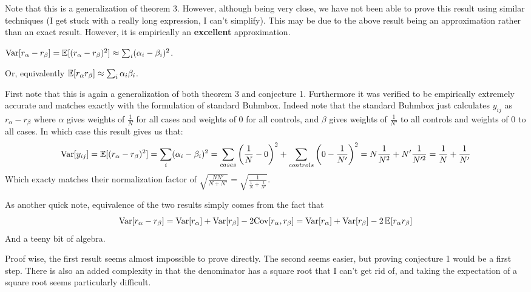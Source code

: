 \documentclass[11pt]{hw-template}
\begin{document}
  \begin{remark}
    Note that this is a generalization of theorem 3. However, although being very close, we have not been able to prove this result using similar techniques (I get stuck with a really long expression,
    I can't simplify). This may be due to the above result being an approximation rather than an exact result. However, it is empirically an \textbf{excellent} approximation.
  \end{remark}

  \begin{conjecture}
    $\operatorname{Var}[r_\alpha - r_\beta] = \operatorname{\mathbb{E}}[(r_\alpha - r_\beta)^2] \approx \sum_i (\alpha_i - \beta_i)^2$.
    
    Or, equivalently $\operatorname{\mathbb{E}}[r_\alpha r_\beta] \approx \sum_i \alpha_i \beta_i$.
  \end{conjecture}

  \begin{remark}
    First note that this is again a generalization of both theorem 3 and conjecture 1. Furthermore it was verified to be empirically extremely accurate and matches exactly with the formulation of standard Buhmbox.
    Indeed note that the standard Buhmbox just calculates $y_{ij}$ as $r_\alpha - r_\beta$ where $\alpha$ gives weights of $\frac{1}{N}$ for all cases and weights of 0 for all controls, and $\beta$ gives weights
    of $\frac{1}{N'}$ to all controls and weights of 0 to all cases. In which case this result gives us that:
    $$\operatorname{Var}[y_{ij}] = \operatorname{\mathbb{E}}[(r_\alpha - r_\beta)^2] = \sum_i (\alpha_i - \beta_i)^2 = \sum_{cases} \left(\frac{1}{N} - 0\right)^2 + \sum_{controls} \left(0 - \frac{1}{N'}\right)^2 = N\frac{1}{N^2} + N' \frac{1}{N'^2} = \frac{1}{N} + \frac{1}{N'}$$ 
    Which exacty matches their normalization factor of $\sqrt{\frac{NN'}{N+N'}} = \sqrt{\frac{1}{\frac{1}{N} + \frac{1}{N'}}}$.
    
    \bigskip
    
    As another quick note, equivalence of the two results simply comes from the fact that
    $$\operatorname{Var}[r_\alpha - r_\beta] = \operatorname{Var}[r_\alpha] + \operatorname{Var}[r_\beta] -2\text{Cov}[r_\alpha, r_\beta] = \operatorname{Var}[r_\alpha] + \operatorname{Var}[r_\beta] -2\operatorname{\mathbb{E}}[r_\alpha r_\beta]$$
    And a teeny bit of algebra.
    
    \bigskip
    
    Proof wise, the first result seems almost impossible to prove directly. The second seems easier, but proving conjecture 1 would be a first step. There is also an added complexity in that the denominator has
    a square root that I can't get rid of, and taking the expectation of a square root seems particularly difficult.
    
  \end{remark}
\end{document}
